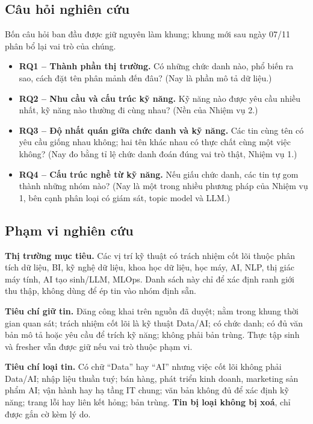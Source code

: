 \documentclass[12pt]{article}
\begin{document}
\subsection{Câu hỏi nghiên cứu}
\label{sec:rq}

Bốn câu hỏi ban đầu được giữ nguyên làm khung; khung mới sau ngày 07/11 phân bổ lại vai trò của chúng.

\begin{itemize}[noitemsep, topsep=2pt, leftmargin=3em]
\item \textbf{RQ1 -- Thành phần thị trường.} Có những chức danh nào, phổ biến ra sao, cách đặt tên phân mảnh đến đâu? (Nay là phần mô tả dữ liệu.)
\item \textbf{RQ2 -- Nhu cầu và cấu trúc kỹ năng.} Kỹ năng nào được yêu cầu nhiều nhất, kỹ năng nào thường đi cùng nhau? (Nền của Nhiệm vụ 2.)
\item \textbf{RQ3 -- Độ nhất quán giữa chức danh và kỹ năng.} Các tin cùng tên có yêu cầu giống nhau không; hai tên khác nhau có thực chất cùng một việc không? (Nay đo bằng tỉ lệ chức danh đoán đúng vai trò thật, Nhiệm vụ 1.)
\item \textbf{RQ4 -- Cấu trúc nghề từ kỹ năng.} Nếu giấu chức danh, các tin tự gom thành những nhóm nào? (Nay là một trong nhiều phương pháp của Nhiệm vụ 1, bên cạnh phân loại có giám sát, topic model và LLM.)
\end{itemize}

\subsection{Phạm vi nghiên cứu}
\label{sec:scope}

\textbf{Thị trường mục tiêu.} Các vị trí kỹ thuật có trách nhiệm cốt lõi thuộc phân tích dữ liệu, BI, kỹ nghệ dữ liệu, khoa học dữ liệu, học máy, AI, NLP, thị giác máy tính, AI tạo sinh/LLM, MLOps. Danh sách này chỉ để xác định ranh giới thu thập, không dùng để ép tin vào nhóm định sẵn.

\textbf{Tiêu chí giữ tin.} Đăng công khai trên nguồn đã duyệt; nằm trong khung thời gian quan sát; trách nhiệm cốt lõi là kỹ thuật Data/AI; có chức danh; có đủ văn bản mô tả hoặc yêu cầu để trích kỹ năng; không phải bản trùng. Thực tập sinh và fresher vẫn được giữ nếu vai trò thuộc phạm vi.

\textbf{Tiêu chí loại tin.} Có chữ ``Data'' hay ``AI'' nhưng việc cốt lõi không phải Data/AI; nhập liệu thuần tuý; bán hàng, phát triển kinh doanh, marketing sản phẩm AI; vận hành hay hạ tầng IT chung; văn bản không đủ để xác định kỹ năng; trang lỗi hay liên kết hỏng; bản trùng. \textbf{Tin bị loại không bị xoá}, chỉ được gắn cờ kèm lý do.
\end{document}
